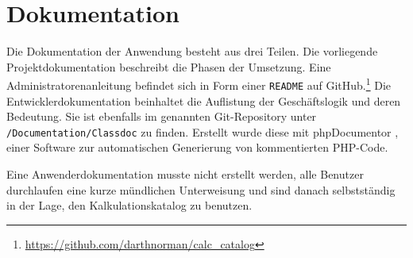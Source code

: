 \section{Dokumentation}
\label{sec:Dokumentation}
Die Dokumentation der Anwendung besteht aus drei Teilen. Die vorliegende
Projektdokumentation beschreibt die Phasen der Umsetzung. Eine
Administratorenanleitung befindet sich in Form einer \texttt{README} auf
GitHub.\footnote{\url{https://github.com/darthnorman/calc_catalog}}
Die Entwicklerdokumentation beinhaltet die Auflistung der Geschäftslogik und
deren Bedeutung. Sie ist ebenfalls im genannten Git-Repository unter
\texttt{/Documentation/Classdoc} zu finden. Erstellt wurde diese mit
phpDocumentor \citet{phpDoc}, einer Software zur automatischen Generierung von
kommentierten \acs{PHP}-Code.

Eine Anwenderdokumentation musste nicht erstellt werden, alle Benutzer
durchlaufen eine kurze mündlichen Unterweisung und sind danach selbstständig
in der Lage, den Kalkulationskatalog zu benutzen.
